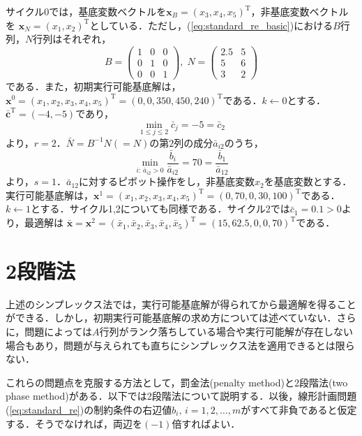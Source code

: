 \documentclass{jsreport}
\begin{document}
サイクル0では，基底変数ベクトルを$\bm{x}_B = (x_3, x_4, x_5)^{\mathrm{T}}$，非基底変数ベクトルを
$\bm{x}_N = (x_1, x_2)^{\mathrm{T}}$としている．ただし，(\ref{eq:standard_re_basic})における$B$行列，$N$行列はそれぞれ，
\begin{equation}
  B = \left(
  \begin{array}{ccc}
    1 & 0 & 0 \\
    0 & 1 & 0 \\
    0 & 0 & 1
  \end{array}
  \right), \; N = \left(
  \begin{array}{cc}
    2.5 & 5 \\
    5   & 6 \\
    3   & 2
  \end{array}
  \right) \nonumber
\end{equation}
である．また，初期実行可能基底解は，$\bm{x}^0 = (x_1, x_2, x_3, x_4, x_5)^{\mathrm{T}} = (0, 0, 350, 450, 240)^{\mathrm{T}}$である．$k \leftarrow 0$とする．
$\bar{\bm{c}}^{\mathrm{T}} = (-4, -5)$であり，
\begin{equation}
  \min_{1 \leq j \leq 2} \bar{c}_{j} = -5 = \bar{c}_2 \nonumber
\end{equation}
より，$r = 2$．$\bar{N} = B^{-1}N (= N)$の第$2$列の成分$\bar{a}_{i2}$のうち，
\begin{equation}
  \min_{i: \, \bar{a}_{i2} > 0} \frac{\bar{b}_i}{\bar{a}_{i2}} =  70 = \frac{\bar{b}_1}{\bar{a}_{12}} \nonumber
\end{equation}
より，$s = 1$．$\bar{a}_{12}$に対するピボット操作をし，非基底変数$x_2$を基底変数とする．
実行可能基底解は，$\bm{x}^1 = (x_1, x_2, x_3, x_4, x_5)^{\mathrm{T}} = (0, 70, 0, 30, 100)^{\mathrm{T}}$である．$k \leftarrow 1$とする．サイクル1,2についても同様である．サイクル2では$\bar{c}_1 = 0.1 > 0$より，最適解は
$\bar{\bm{x}} = \bm{x}^{2} = (\bar{x}_1, \bar{x}_2, \bar{x}_3, \bar{x}_4, \bar{x}_5)^{\mathrm{T}} = (15, 62.5, 0, 0, 70)^{\mathrm{T}}$である．

\section{2段階法}
上述のシンプレックス法では，実行可能基底解が得られてから最適解を得ることができる．しかし，初期実行可能基底解の求め方については述べていない．さらに，問題によっては$A$行列がランク落ちしている場合や実行可能解が存在しない場合もあり，問題が与えられても直ちにシンプレックス法を適用できるとは限らない．

これらの問題点を克服する方法として，罰金法(penalty method)と2段階法(two phase method)がある．以下では2段階法について説明する．以後，線形計画問題(\ref{eq:standard_re})の制約条件の右辺値$b_i, \, i = 1, 2, \ldots, m$がすべて非負であると仮定する．そうでなければ，両辺を$(-1)$倍すればよい．
\end{document}
